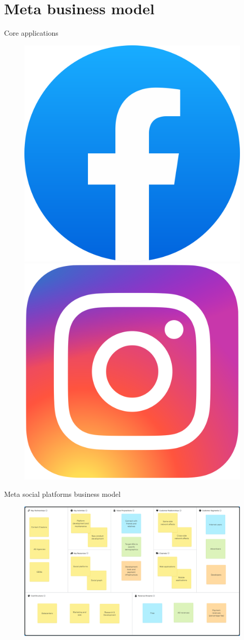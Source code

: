 \documentclass{beamer}
\begin{document}
\section{Meta business model}
\begin{frame}{Core applications}
  \begin{figure}
    \includegraphics[width=.4\textwidth]{images/fb.png}
    \hfill
    \includegraphics[width=.4\textwidth]{images/ig.png}
  \end{figure}
\end{frame}

\begin{frame}{Meta social platforms business model}
  \begin{figure}
    \centering
    \includegraphics[width=\textwidth]{images/fbcanvas}
  \end{figure}
\end{frame}
\end{document}
